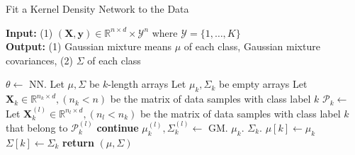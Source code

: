 \documentclass{article}
\begin{document}
\begin{algorithm}
\caption{Fit a Kernel Density Network to the Data}\label{alg:cap}
\hspace*{\algorithmicindent} \textbf{Input:} (1) $(\mathbf{X}, \mathbf{y})  \in \mathbb{R}^{n \times d} \times \mathcal{Y}^n$ where $\mathcal{Y} = \{1, \dots, K \}$ \\
\hspace*{\algorithmicindent} \textbf{Output:} (1) Gaussian mixture means $\mu$ of each class, Gaussian mixture covariances, (2) $\Sigma$ of each class
\begin{algorithmic}[1]
    \State $\theta \gets$ NN. 
    \State Let $\mu, \Sigma$ be $k$-length arrays
        \State Let $\mu_k, \Sigma_k$ be empty arrays
        \State Let $\mathbf{X}_k \in \mathbb{R}^{n_k \times d}, (n_k < n)$ be the matrix of data samples with class label $k$
        \State $\mathcal{P}_k \gets$  
            \State Let $\mathbf{X}_k^{(l)} \in \mathbb{R}^{n_l \times d}, (n_l < n_k)$ be the matrix of data samples with class label $k$ that belong to $\mathcal{P}_k^{(l)}$
                \State \textbf{continue}
            \EndIf
            \State $\mu_k^{(l)}, \Sigma_k^{(l)} \gets $ GM. 
            \State $\mu_k$.
            \State $\Sigma_k$.
        \EndFor
        \State $\mu[k] \gets \mu_k$
        \State $\Sigma[k] \gets \Sigma_k$
    \EndFor
    \State \textbf{return} $(\mu, \Sigma)$
\EndFunction
\end{algorithmic}
\end{algorithm}
\end{document}
